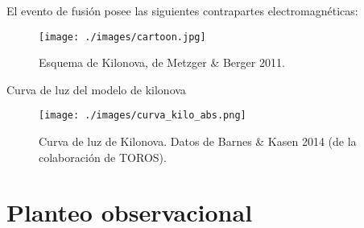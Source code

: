 \documentclass[10pt]{beamer}
\begin{document}
\begin{frame}
El evento de fusi\'on posee las siguientes contrapartes electromagn\'eticas:
    \begin{figure}[H]
  \centering
 \texttt{[image: ./images/cartoon.jpg]}
 \caption{\scriptsize{Esquema de Kilonova, de Metzger \& Berger 2011.}}
\end{figure}%
\end{frame}
\begin{frame}
Curva de luz del modelo de kilonova
\begin{figure}[!h]
 \centering
\texttt{[image: ./images/curva\_kilo\_abs.png]}
 \caption{\scriptsize{Curva de luz de Kilonova. Datos de Barnes \& Kasen 2014 (de la colaboraci\'on de TOROS).}}
\end{figure}
\end{frame}
\section{Planteo observacional}
\frame{
\tableofcontents[ 
    currentsection, 
    sectionstyle=show/hide, 
    sectionstyle=show/shaded, 
    ]}
\end{document}
